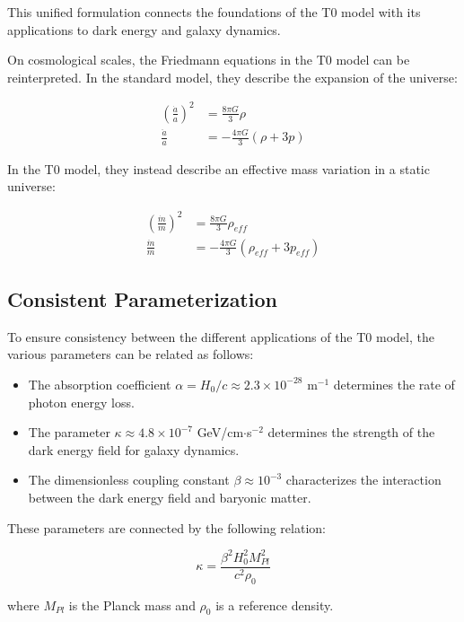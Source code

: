 \documentclass[a4paper,12pt]{article}
\begin{document}
	This unified formulation connects the foundations of the T0 model with its applications to dark energy and galaxy dynamics.
	
	On cosmological scales, the Friedmann equations in the T0 model can be reinterpreted. In the standard model, they describe the expansion of the universe:
	
	\begin{align}
		\left(\frac{\dot{a}}{a}\right)^2 &= \frac{8\pi G}{3}\rho \\
		\frac{\ddot{a}}{a} &= -\frac{4\pi G}{3}(\rho + 3p)
	\end{align}
	
	In the T0 model, they instead describe an effective mass variation in a static universe:
	
	\begin{align}
		\left(\frac{\dot{m}}{m}\right)^2 &= \frac{8\pi G}{3}\rho_{eff} \\
		\frac{\ddot{m}}{m} &= -\frac{4\pi G}{3}(\rho_{eff} + 3p_{eff})
	\end{align}
	
	\subsection{Consistent Parameterization}
	
	To ensure consistency between the different applications of the T0 model, the various parameters can be related as follows:
	
	\begin{itemize}
		\item The absorption coefficient $\alpha = H_{0}/c \approx 2.3 \times 10^{-28}$ m$^{-1}$ determines the rate of photon energy loss.
		\item The parameter $\kappa \approx 4.8 \times 10^{-7}$ GeV/cm$\cdot$s$^{-2}$ determines the strength of the dark energy field for galaxy dynamics.
		\item The dimensionless coupling constant $\beta \approx 10^{-3}$ characterizes the interaction between the dark energy field and baryonic matter.
	\end{itemize}
	
	These parameters are connected by the following relation:
	
	\begin{equation}
		\kappa = \frac{\beta^2 H_0^2 M_{Pl}^2}{c^2 \rho_0}
	\end{equation}
	
	where $M_{Pl}$ is the Planck mass and $\rho_0$ is a reference density.
	
\end{document}
